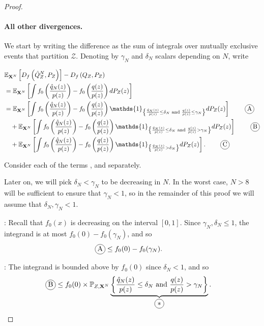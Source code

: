 \begin{proof}
\paragraph{All other divergences.}

We start by writing the difference as the sum of integrals over mutually exclusive events that partition $\mathcal{Z}$.
Denoting by $\gamma_N$ and $\delta_N$ scalars depending on $N$, write

\begin{align*}
    & \E_{\XN} \left[ D_f\left( \hat{Q}_Z^N , P_Z\right)\right] - D_f\left( Q_{Z} , P_Z\right)  \\
    &= \E_{\XN} \left[\int f_0\left( \frac{\hat{q}_N(z)}{p(z)} \right) - f_0\left( \frac{q(z)}{p(z)} \right) dP_Z(z) \right] \\
    &= \E_{\XN} \left[ \int f_0\left( \frac{\hat{q}_N(z)}{p(z)} \right) - f_0\left( \frac{q(z)}{p(z)} \right) \mathds{1}_{\left\lbrace \frac{\hat{q}_N(z)}{p(z)} \leq \delta_N \text{ and } \frac{q(z)}{p(z)} \leq \gamma_N \right\rbrace} dP_Z(z) \right] \tag*{\encircle{A}}\\
    & \quad + \E_{\XN} \left[\int f_0\left( \frac{\hat{q}_N(z)}{p(z)} \right) - f_0\left( \frac{q(z)}{p(z)} \right) \mathds{1}_{\left\lbrace \frac{\hat{q}_N(z)}{p(z)} \leq \delta_N \text{ and } \frac{q(z)}{p(z)} > \gamma_N \right\rbrace} dP_Z(z) \right]\tag*{\encircle{B}}\\
    & \quad + \E_{\XN} \left[ \int f_0\left( \frac{\hat{q}_N(z)}{p(z)} \right) - f_0\left( \frac{q(z)}{p(z)} \right) \mathds{1}_{\left\lbrace \frac{\hat{q}_N(z)}{p(z)} > \delta_N \right\rbrace} dP_Z(z) \right]. \tag*{\encircle{C}}
\end{align*}

Consider each of the terms ,  and   separately.

Later on, we will pick $\delta_N < \gamma_N$ to be decreasing in $N$.
In the worst case, $N>8$ will be sufficient to ensure that $\gamma_N < 1$, so in the remainder of this proof we will assume that $\delta_N, \gamma_N < 1$.

: 
Recall that $f_0(x)$ is decreasing on the interval $[0,1]$.
Since $\gamma_N, \delta_N \leq 1$, the integrand is at most $f_0(0) - f_0(\gamma_N)$, and so
\begin{align*}
    \encircle{A} &\leq f_0(0) - f_0(\gamma_N).
\end{align*}


:
The integrand is bounded above by $f_0(0)$ since $\delta_N<1$, and so 
\begin{align*}
    \encircle{B} &\leq f_0(0) \times \mathbb{P}_{Z,\XN}
    \underbrace{
    \left\lbrace \frac{\hat{q}_N(z)}{p(z)} \leq \delta_N \text{ and } \frac{q(z)}{p(z)} > \gamma_N \right\rbrace}_{\encircle{$*$}}.
\end{align*}


\end{proof}
